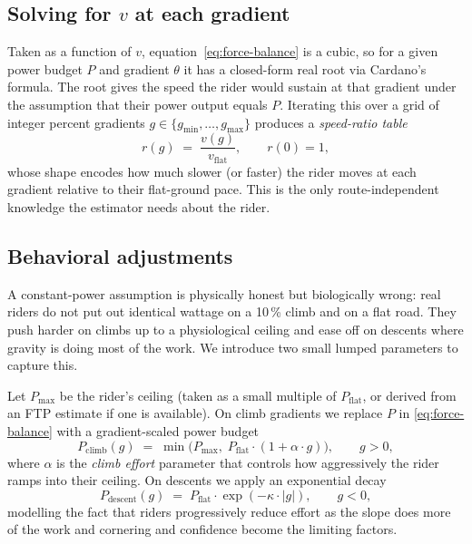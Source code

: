 \documentclass[11pt,a4paper]{article}
\begin{document}
\subsection{Solving for $v$ at each gradient}

Taken as a function of $v$, equation~\eqref{eq:force-balance} is a
cubic, so for a given power budget $P$ and gradient $\theta$ it has a
closed-form real root via Cardano's formula. The root gives the speed
the rider would sustain at that gradient under the assumption that
their power output equals $P$. Iterating this over a grid of integer
percent gradients $g \in \{g_{\min}, \dots, g_{\max}\}$ produces a
\emph{speed-ratio table}
\begin{equation}
r(g) \;=\; \frac{v(g)}{v_{\text{flat}}},
\qquad r(0) = 1,
\end{equation}
whose shape encodes how much slower (or faster) the rider moves at
each gradient relative to their flat-ground pace. This is the only
route-independent knowledge the estimator needs about the rider.

\subsection{Behavioral adjustments}

A constant-power assumption is physically honest but biologically
wrong: real riders do not put out identical wattage on a 10\,\% climb
and on a flat road. They push harder on climbs up to a physiological
ceiling and ease off on descents where gravity is doing most of the
work. We introduce two small lumped parameters to capture this.

Let $P_{\max}$ be the rider's ceiling (taken as a small multiple of
$P_{\text{flat}}$, or derived from an FTP estimate if one is
available). On climb gradients we replace $P$ in
\eqref{eq:force-balance} with a gradient-scaled power budget
\begin{equation}
\label{eq:climb-power}
P_{\text{climb}}(g) \;=\; \min\!\big(P_{\max},\;
  P_{\text{flat}} \cdot (1 + \alpha \cdot g)\big),
\qquad g > 0,
\end{equation}
where $\alpha$ is the \emph{climb effort} parameter that controls how
aggressively the rider ramps into their ceiling. On descents we apply
an exponential decay
\begin{equation}
\label{eq:descent-power}
P_{\text{descent}}(g) \;=\; P_{\text{flat}} \cdot \exp(-\kappa \cdot |g|),
\qquad g < 0,
\end{equation}
modelling the fact that riders progressively reduce effort as the
slope does more of the work and cornering and confidence become the
limiting factors.
\end{document}
